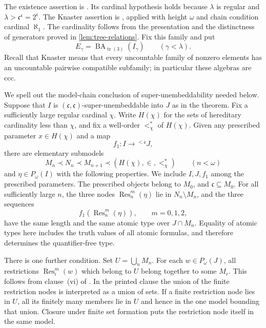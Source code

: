 \documentclass[11pt]{article}
\theoremstyle{definition}
\theoremstyle{remark}
\newcommand{\Res}{\operatorname{Res}}
\newcommand{\BA}{\operatorname{BA}_{\operatorname{tr}(3)}}
\newcommand{\cc}{\mathfrak c}
\begin{document}
The existence assertion is
\cite[Definitions~1.4(1),(3),(4), 1.6(2), and Lemma~1.11(1)]{Shelah2023}.
Its cardinal hypothesis holds because $\lambda$ is regular and
$\lambda>\cc^\cc=2^\cc$.  The Knaster assertion is
\cite[Claim~2.6(3)]{Shelah2026}, applied with height $\omega$ and chain
condition cardinal $\aleph_1$.  The cardinality follows from the
presentation and the distinctness of generators proved in
\cref{lem:tree-relations}.  Fix this family and put
\[
 E_\gamma=\BA(I_\gamma)\qquad(\gamma<\lambda).
\]
Recall that Knaster means that every
uncountable family of nonzero elements has an uncountable pairwise
compatible subfamily; in particular these algebras are ccc.

We spell out the model-chain conclusion of super-unembeddability needed
below.  Suppose that $I$ is $(\cc,\cc)$-super-unembeddable into $J$ as in
the theorem.  Fix a sufficiently large regular cardinal $\chi$.
Write $H(\chi)$ for the sets of hereditary cardinality less than $\chi$,
and fix a well-order $<^*_\chi$ of $H(\chi)$.  Given any prescribed
parameter $x\in H(\chi)$ and a map
\[
 f_1:I\longrightarrow {}^{<\cc}J,
\]
there are elementary submodels
\begin{equation}\label{eq:model-chain}
 M_n\prec N_n\prec M_{n+1}\prec(H(\chi),\in,<^*_\chi)
 \qquad(n<\omega)
\end{equation}
and $\eta\in P_\omega(I)$ with the following properties.  We include
$I,J,f_1$ among the prescribed parameters.  The prescribed
objects belong to $M_0$, and $\cc\subseteq M_0$.  For all sufficiently
large $n$, the three nodes $\Res_n^m(\eta)$ lie in $N_n\setminus M_n$,
and the three sequences
\begin{equation}\label{eq:three-sequence-types}
 f_1(\Res_n^m(\eta)),\qquad m=0,1,2,
\end{equation}
have the same length and the same atomic type over $J\cap M_n$.
Equality of atomic types here includes the truth values of all atomic
formulas, and therefore determines the quantifier-free type.

There is one further condition.  Set $U=\bigcup_n M_n$.  For each
$w\in P_\omega(J)$, all restrictions $\Res_i^m(w)$ which belong to $U$
belong together to some $M_r$.  This follows from clause~(vi) of
\cite[Definition~1.4(1)]{Shelah2023}.  In the printed clause the union of
the finite restriction nodes is interpreted as a union of sets.  If a
finite restriction node lies in $U$, all its finitely many members lie in
$U$ and hence in the one model bounding that union.  Closure under finite
set formation puts the restriction node itself in the same model.
\end{document}
